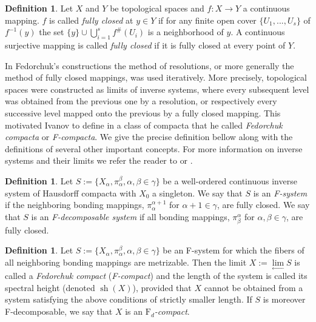 \documentclass[11pt]{article}
\DeclareMathOperator{\sht}{sh}
\theoremstyle{definition}
\newtheorem{definition}[theorem]{Definition}
\theoremstyle{remark}
\begin{document}
\begin{definition} \label{fully_closed}
	Let $X$ and $Y$ be topological spaces and $f: X \to Y$ a continuous mapping. $f$ is called \textit{fully closed} at $y \in Y$ if for any finite open cover $\{U_1, ..., U_s\}$ of $f^{-1}(y)$ the set $\{y\} \cup \bigcup_{i = 1}^s f^\#\left(U_i\right)$ is a neighborhood of $y$. A continuous surjective mapping is called \textit{fully closed} if it is fully closed at every point of $Y$.
\end{definition}

In Fedorchuk's constructions the method of resolutions, or more generally the method of fully closed mappings, was used iteratively. More precisely, topological spaces were constructed as limits of inverse systems, where every subsequent level was obtained from the previous one by a resolution, or respectively every successive level mapped onto the previous by a fully closed mapping. This motivated Ivanov to define in \cite{ivanov1984fedorchuk} a class of compacta that he called \emph{Fedorchuk compacta} or \emph{F-compacta}. We give the precise definition bellow along with the definitions of several other important concepts. For more information on inverse systems and their limits we refer the reader to \cite[Chapter 2.5]{eng} or \cite{fedFC}.

\begin{definition} \label{F-system}
	Let $S := \{X_\alpha, \pi^\beta_\alpha, \alpha, \beta \in \gamma\}$ be a well-ordered continuous inverse system of Hausdorff compacta with $X_0$ a singleton. We say that $S$ is an \emph{F-system} if the neighboring bonding mappings, $\pi^{\alpha+1}_\alpha$ for $\alpha + 1 \in \gamma$, are fully closed. We say that $S$ is an \emph{F-decomposable system} if all bonding mappings, $\pi^\alpha_\beta$ for $\alpha, \beta \in \gamma$, are fully closed.
\end{definition}

\begin{definition}\label{F-comp}
	Let $S := \{X_\alpha, \pi^\beta_\alpha, \alpha, \beta \in \gamma\}$ be an F-system for which the fibers of all neighboring bonding mappings are metrizable. Then the limit $X := \lim\limits_{\leftarrow} S$ is called a \emph{Fedorchuk compact} (\emph{F-compact}) and the length of the system is called its spectral height (denoted $\sht(X)$), provided that $X$ cannot be obtained from a system satisfying the above conditions of strictly smaller length. If $S$ is moreover F-decomposable, we say that $X$ is an \emph{$\mathrm{F}_d$-compact}.
\end{definition}
\end{document}

